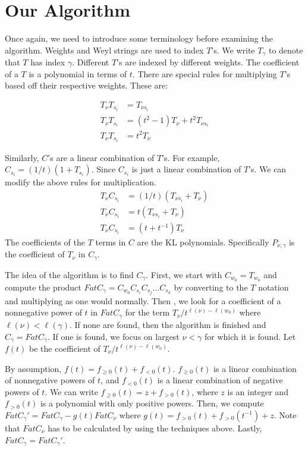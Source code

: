 \documentclass[12pt]{article} %
\begin{document}
\section{Our Algorithm}

Once again, we need to introduce some terminology before examining the algorithm. Weights and Weyl strings are used to index $T$'s. We write $T_\gamma$ to denote that $T$ has index $\gamma$.  Different $T$'s are indexed by different weights. The coefficient of a $T$ is a polynomial in terms of $t$. There are special rules for multiplying $T$'s based off their respective weights.  These are:

\begin{align*}
T_\nu T_{s_i} & = T_{\nu s_i} \tag{$\ell(\nu s_i) > \ell(\nu)$} \\
T_\nu T_{s_i} & = (t^2-1) T_\nu+t^2T_{\nu s_i} \tag{$\ell(\nu s_i) > \ell(\nu)$} \\
T_\nu T_{s_i} & = t^2T_\nu \tag{$\ell(\nu s_i) = \ell(\nu)$}
\end{align*}

Similarly, $C$'s are a linear combination of $T$'s.  For example, $C_{s_i} = (1/t)(1+T_{s_i})$.  Since $C_{s_i}$ is just a linear combination of $T$'s. We can modify the above rules for multiplication.
\begin{align*}
T_\nu C_{s_i} & = (1/t)(T_{\nu s_i}+T_\nu) \tag{$\ell(\nu s_i) > \ell(\nu)$} \\
T_\nu C_{s_i} & = t( T_{\nu s_i}+T_{\nu}) \tag{$\ell(\nu s_i) > \ell(\nu)$} \\
T_\nu C_{s_i} & = (t+t^{-1})T_\nu \tag{$\ell(\nu s_i) = \ell(\nu)$}
\end{align*}
The coefficients of the $T$ terms in $C$ are the KL polynomials. Specifically $P_{\nu,\gamma}$ is the coefficient of $T_\nu$ in $C_\gamma$.


The idea of the algorithm is to find $C_\gamma$. First, we start with $C_{w_0} = T_{w_0}$ and compute the product $FatC_\gamma = C_{w_0}C_{s_i}C_{s_j}...C_{s_k}$ by converting to the $T$ notation and  multiplying as one would normally. Then , we look for a coefficient of a nonnegative power of $t$ in $FatC_\gamma$ for the term $T_\nu / t^{\ell(\nu)-\ell(w_0)}$ where $\ell(\nu) < \ell(\gamma)$. If none are found, then the algorithm is finished and $C_\gamma = FatC_\gamma$. If one is found, we focus on largest $\nu < \gamma$ for which it is found. Let $f(t)$ be the coefficient of $T_\nu / t^{\ell(\nu)-\ell(w_0)}$.

By assumption, $f(t) = f_{\geq 0}(t) + f_{<0} (t)$. $f_{\geq 0}(t)$ is a linear combination of nonnegative powers of $t$, and $f_{<0} (t)$ is a linear combination of negative powers of $t$. We can write $f_{\geq 0}(t) = z + f_{> 0}(t)$, where $z$ is an integer and  $ f_{> 0}(t)$ is a polynomial with only positive powers. Then, we compute $FatC_\gamma ' = FatC_\gamma - g(t)FatC_\nu$ where $g(t) = f_{>0}(t) + f_{>0}(t^{-1})+z$. Note that $FatC_\nu$ has to be calculated by using the techniques above. Lastly, $FatC_\gamma = FatC_\gamma'$.
\end{document}
